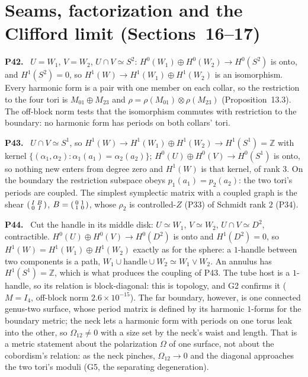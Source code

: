 \documentclass[11pt]{article}
\newcommand{\Z}{\mathbb{Z}}
\newenvironment{solution}[1]{\medskip\noindent\textbf{P#1.}\ }{\par\medskip}
\begin{document}
\section*{Seams, factorization and the Clifford limit (Sections~16--17)}

\begin{solution}{42}
$U = W_1$, $V = W_2$, $U\cap V\simeq S^2$:
$H^0(W_1)\oplus H^0(W_2)\to H^0(S^2)$ is onto, and $H^1(S^2)=0$, so
$H^1(W)\to H^1(W_1)\oplus H^1(W_2)$ is an isomorphism. Every harmonic form is a
pair with one member on each collar, so the restriction to the four tori is
$M_{01}\oplus M_{23}$ and $\rho = \rho(M_{01})\otimes\rho(M_{23})$
(Proposition~13.3). The off-block norm tests that the isomorphism commutes
with restriction to the boundary: no harmonic form has periods on both
collars' tori.
\end{solution}

\begin{solution}{43}
$U\cap V\simeq S^1$, so $H^1(W)\to H^1(W_1)\oplus H^1(W_2)\to H^1(S^1)=\Z$ with
kernel $\{(\alpha_1,\alpha_2):\alpha_1(a_1) = \alpha_2(a_2)\}$; $H^0(U)\oplus H^0(V)\to H^0(S^1)$
is onto, so nothing new enters from degree zero and $H^1(W)$ is that kernel,
of rank $3$. On the boundary the restriction subspace obeys $p_1(a_1) = p_2(a_2)$:
the two tori's periods are coupled. The simplest symplectic matrix with a
coupled graph is the shear $\begin{psmallmatrix}I&B\\0&I\end{psmallmatrix}$,
$B = \begin{psmallmatrix}0&1\\1&0\end{psmallmatrix}$, whose $\rho_2$ is controlled-$Z$
(P33) of Schmidt rank $2$ (P34).
\end{solution}

\begin{solution}{44}
Cut the handle in its middle disk: $U\simeq W_1$, $V\simeq W_2$, $U\cap V\simeq D^2$,
contractible. $H^0(U)\oplus H^0(V)\to H^0(D^2)$ is onto and $H^1(D^2)=0$, so
$H^1(W) = H^1(W_1)\oplus H^1(W_2)$ exactly as for the sphere: a $1$-handle
between two components is a path, $W_1\cup\text{handle}\cup W_2\simeq W_1\vee W_2$.
An annulus has $H^1(S^1)=\Z$, which is what produces the coupling of P43.
The tube host is a $1$-handle, so its relation is block-diagonal: this is
topology, and G2 confirms it ($M = I_4$, off-block norm $2.6\times10^{-15}$).
The far boundary, however, is one connected genus-two surface, whose period
matrix is defined by its harmonic $1$-forms for the boundary metric; the
neck lets a harmonic form with periods on one torus leak into the other, so
$\Omega_{12}\ne0$ with a size set by the neck's waist and length. That is a
metric statement about the polarization $\Omega$ of one surface, not about
the cobordism's relation: as the neck pinches, $\Omega_{12}\to0$ and the
diagonal approaches the two tori's moduli (G5, the separating degeneration).
\end{solution}
\end{document}
